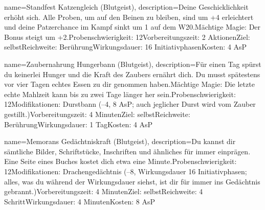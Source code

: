 {
    name={Standfest Katzengleich (Blutgeist)},
    description={Deine Geschicklichkeit erhöht sich. Alle Proben, um auf den Beinen zu bleiben, sind um +4 erleichtert und deine Patzerchance im Kampf sinkt um 1 auf dem W20.\newline Mächtige Magie: Der Bonus steigt um +2.\newline Probenschwierigkeit: 12\newline Vorbereitungszeit: 2 Aktionen\newline Ziel: selbst\newline Reichweite: Berührung\newline Wirkungsdauer: 16 Initiativphasen\newline Kosten: 4 AsP}
}


{
    name={Zaubernahrung Hungerbann (Blutgeist)},
    description={Für einen Tag spürst du keinerlei Hunger und die Kraft des Zaubers ernährt dich. Du musst spätestens vor vier Tagen echtes Essen zu dir genommen haben.\newline Mächtige Magie: Die letzte echte Mahlzeit kann bis zu zwei Tage länger her sein.\newline Probenschwierigkeit: 12\newline Modifikationen: Durstbann (–4, 8 AsP; auch jeglicher Durst wird vom Zauber gestillt.)\newline Vorbereitungszeit: 4 Minuten\newline Ziel: selbst\newline Reichweite: Berührung\newline Wirkungsdauer: 1 Tag\newline Kosten: 4 AsP}
}


{
    name={Memorans Gedächtniskraft (Blutgeist)},
    description={Du kannst dir sämtliche Bilder, Schriftstücke, Inschriften und ähnliches für immer einprägen. Eine Seite eines Buches kostet dich etwa eine Minute.\newline Probenschwierigkeit: 12\newline Modifikationen: Drachengedächtnis (–8, Wirkungsdauer 16 Initiativphasen; alles, was du während der Wirkungsdauer siehst, ist dir für immer ins Gedächtnis gebrannt.)\newline Vorbereitungszeit: 4 Minuten\newline Ziel: selbst\newline Reichweite: 4 Schritt\newline Wirkungsdauer: 4 Minuten\newline Kosten: 8 AsP}
}


